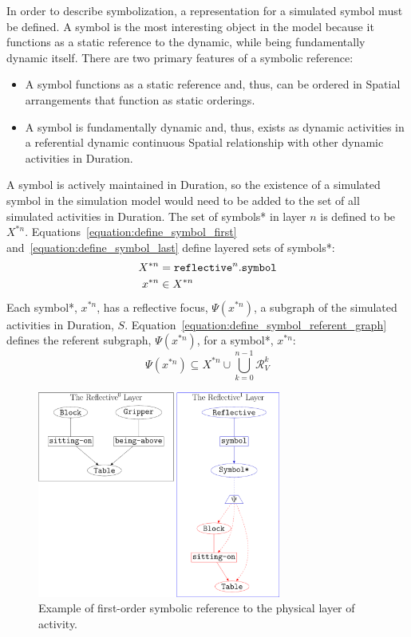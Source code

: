 In order to describe symbolization, a representation for a simulated
symbol must be defined.  A symbol is the most interesting object in
the model because it functions as a static reference to the dynamic,
while being fundamentally dynamic itself.  There are two primary
features of a symbolic reference:
\begin{itemize}
\item A symbol functions as a static reference and, thus, can be
  ordered in Spatial arrangements that function as static orderings.
\item A symbol is fundamentally dynamic and, thus, exists as dynamic
  activities in a referential dynamic continuous Spatial relationship
  with other dynamic activities in Duration.
\end{itemize}
A symbol is actively maintained in Duration, so the existence of a
simulated symbol in the simulation model would need to be added to the
set of all simulated activities in Duration.  The set of symbols* in
layer $n$ is defined to be $X^{*n}$.
{\mbox{Equations~\ref{equation:define_symbol_first}}}
{\mbox{and~\ref{equation:define_symbol_last}}} define layered sets of
symbols*:
\begin{align}
\label{equation:define_symbol_first}
           X^{*n} &= \text{\tt{reflective}}^n.\text{\tt{symbol}} \\
\label{equation:define_symbol_last}
           x^{*n} &\in X^{*n}
\end{align}
Each symbol*, $x^{*n}$, has a reflective focus, $\Psi(x^{*n})$, a
subgraph of the simulated activities in Duration, $S$.
{\mbox{Equation~\ref{equation:define_symbol_referent_graph}}} defines
the referent subgraph, $\Psi(x^{*n})$, for a symbol*, $x^{*n}$:
\begin{equation}
\label{equation:define_symbol_referent_graph}
  \Psi(x^{*n}) \subseteq X^{*n} \cup \bigcup_{k=0}^{n-1}\mathcal{R}^k_V
\end{equation}
\begin{figure}
\center
\includegraphics[width=8cm]{gfx/example_symbolic_reference_to_physical_activity}
\caption{Example of first-order symbolic reference to the physical
  layer of activity.}
\label{figure:example_symbolic_reference_to_physical_activity}
\end{figure}



